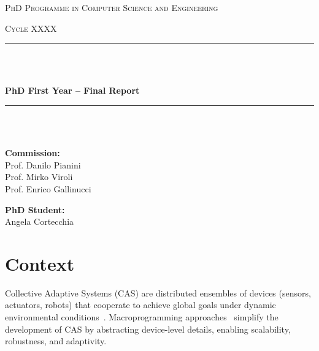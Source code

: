 \documentclass[runningheads]{llncs}
\begin{document}
    \begin{titlepage}
        \centering
        \vspace*{2cm}

        {\scshape\Large PhD Programme in Computer Science and Engineering \par}
        \vspace{0.5cm}
        {\scshape\large Cycle XXXX \par}
        \vspace{0.5cm}

        \rule{\linewidth}{0.4mm} \\ [0.1mm]
        \raisebox{0.2cm}{\rule{\linewidth}{0.8mm}} \\[0.8cm]
        {\huge\bfseries PhD First Year -- Final Report \par}
        \vspace{0.8cm}
        \rule{\linewidth}{0.8mm} \\ [0.1pt]
        \raisebox{0.2cm}{\rule{\linewidth}{0.4mm}} \\[1.5cm]


        \vspace{1.5cm}

        \noindent
        \begin{minipage}[t]{0.45\textwidth}
            \raggedright
            \textbf{Commission:}\\[0.5cm]
            Prof. Danilo Pianini\\
            Prof. Mirko Viroli\\
            Prof. Enrico Gallinucci
        \end{minipage}%
        \hfill
        \begin{minipage}[t]{0.45\textwidth}
            \raggedleft
            \textbf{PhD Student:}\\[0.5cm]
            Angela Cortecchia
        \end{minipage}

        \vfill

    \end{titlepage}

    \section{Context}
    Collective Adaptive Systems (CAS) are distributed ensembles of devices (sensors, actuators, robots) that cooperate to achieve global goals under dynamic environmental conditions~\cite{DBLP:conf/huc/Ferscha15}.
    Macroprogramming approaches~\cite{casadei22} simplify the development of CAS by abstracting device-level details, enabling scalability, robustness, and adaptivity.
\end{document}
